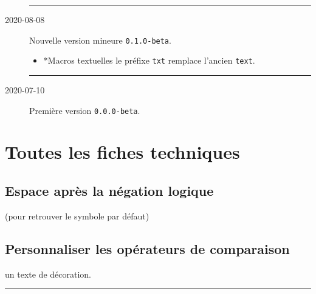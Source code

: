 \documentclass[12pt,a4paper]{article}
\makeatletter
\theoremstyle{definition}
\newcommand\topic{\@ifstar{\@topic@star}{\@topic@no@star}}
\newcommand\@topic@no@star[1]{%
    \textbf{\textsc{#1}.}%
}
\newcommand\@topic@star[1]{%
    \textbf{\textsc{#1} :}%
}
\newcommand\separation{
    \medskip
    \hfill\rule{0.5\textwidth}{0.75pt}\hfill
    \medskip
}
\makeatother
\begin{document}
\begin{description}
    
    \separation


    \medskip
    \item[2020-08-08] Nouvelle version mineure \verb+0.1.0-beta+.
    
    \begin{itemize}[itemsep=.5em]
        \item \topic*{Macros \og textuelles \fg}
              le préfixe \verb#txt# remplace l'ancien \verb#text#.
    \end{itemize}
    
    
    \separation

    \medskip
    \item[2020-07-10] Première version \verb+0.0.0-beta+.

\end{description}


\newpage
\section{Toutes les fiches techniques} \label{techincal-ids}









\subsection{Espace après la négation logique}




 (pour retrouver le symbole par défaut)


\subsection{Personnaliser les opérateurs de comparaison}





\IDoption{} un texte de décoration.


\separation





\end{document}
